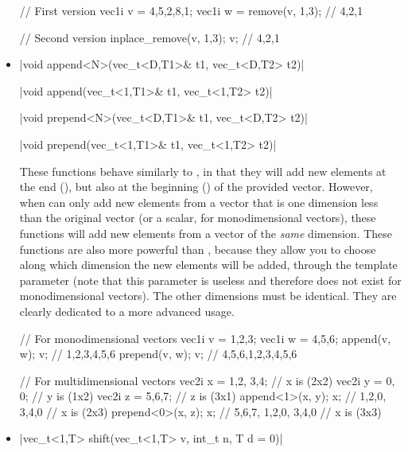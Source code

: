 \documentclass[12pt]{report}
\newenvironment{example}
{
    \begin{mdframed}[style=example,frametitle={Example}]
}
{
    \end{mdframed}
}
\begin{document}
\begin{itemize}
\begin{example}
\begin{cppcode}
// First version
vec1i v = {4,5,2,8,1};
vec1i w = remove(v, {1,3}); // {4,2,1}

// Second version
inplace_remove(v, {1,3});
v; // {4,2,1}
\end{cppcode}
\end{example}

\item \cppinline|void append<N>(vec_t<D,T1>& t1, vec_t<D,T2> t2)| 

\cppinline|void append(vec_t<1,T1>& t1, vec_t<1,T2> t2)|

\cppinline|void prepend<N>(vec_t<D,T1>& t1, vec_t<D,T2> t2)| 

\cppinline|void prepend(vec_t<1,T1>& t1, vec_t<1,T2> t2)|

These functions behave similarly to , in that they will add new elements at the end (), but also at the beginning () of the provided vector. However, when  can only add new elements from a vector that is one dimension less than the original vector (or a scalar, for monodimensional vectors), these functions will add new elements from a vector of the \emph{same} dimension. These functions are also more powerful than , because they allow you to choose along which dimension the new elements will be added, through the template parameter  (note that this parameter is useless and therefore does not exist for monodimensional vectors). The other dimensions must be identical. They are clearly dedicated to a more advanced usage.

\begin{example}
\begin{cppcode}
// For monodimensional vectors
vec1i v = {1,2,3};
vec1i w = {4,5,6};
append(v, w);
v; // {1,2,3,4,5,6}
prepend(v, w);
v; // {4,5,6,1,2,3,4,5,6}

// For multidimensional vectors
vec2i x = {{1,2}, {3,4}};         // x is (2x2)
vec2i y = {{0}, {0}};             // y is (1x2)
vec2i z = {{5,6,7}};              // z is (3x1)
append<1>(x, y);
x; // {{1,2,0}, {3,4,0}}          // x is (2x3)
prepend<0>(x, z);
x; // {{5,6,7}, {1,2,0}, {3,4,0}} // x is (3x3)
\end{cppcode}
\end{example}

\item \cppinline|vec_t<1,T> shift(vec_t<1,T> v, int_t n, T d = 0)| 


\end{itemize}
\end{document}
